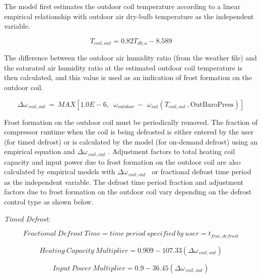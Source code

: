 The model first estimates the outdoor coil temperature according to a linear empirical relationship with outdoor air dry-bulb temperature as the independent variable.

\begin{equation}
{T_{coil,out}} = 0.82{T_{db,o}} - 8.589
\end{equation}

The difference between the outdoor air humidity ratio (from the weather file) and the saturated air humidity ratio at the estimated outdoor coil temperature is then calculated, and this value is used as an indication of frost formation on the outdoor coil.

\begin{equation}
\Delta {\omega_{\,coil,out}}\, = \,MAX\left[ {1.0E - 6,\,\,\,{\omega_{outdoor}}\, - \,\,{\omega_{sat}}\left( {{T_{coil,out}}\,,{\mathrm{OutBaroPress}}} \right)} \right]
\end{equation}

Frost formation on the outdoor coil must be periodically removed. The fraction of compressor runtime when the coil is being defrosted is either entered by the user (for timed defrost) or is calculated by the model (for on-demand defrost) using an empirical equation and \(\Delta {\omega_{\,coil,out}}\) . Adjustment factors to total heating coil capacity and input power due to frost formation on the outdoor coil are also calculated by empirical models with \(\Delta {\omega_{\,coil,out}}\) ~or fractional defrost time period as the independent variable. The defrost time period fraction and adjustment factors due to frost formation on the outdoor coil vary depending on the defrost control type as shown below.

\emph{Timed Defrost}:

\begin{equation}
Fractional~Defrost~Time = time~period~specified~by~user = {t_{frac,defrost}}
\end{equation}

\begin{equation}
Heating~Capacity~Multiplier = 0.909 - 107.33\left( {\Delta {\omega_{\,coil,out}}} \right)
\label{eq:SSEHPDXHeatingCapacityMultiplierTimedDefrost}
\end{equation}

\begin{equation}
Input~Power~Multiplier = 0.9 - 36.45\left( {\Delta {\omega_{\,coil,out}}} \right)
\label{eq:SSEHPDXInputPowerMultiplierTimedDefrost}
\end{equation}

